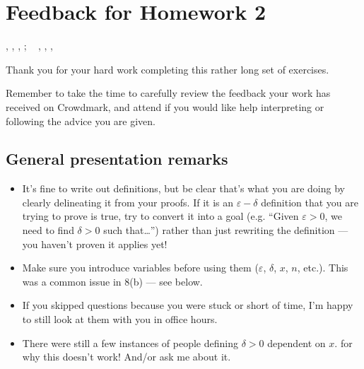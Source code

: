 \documentclass[letterpaper,10pt,english]{jupyterBook}
\begin{document}
\section{Feedback for Homework 2}
\label{\detokenize{HW-feedback:feedback-for-homework-2}}
\sphinxAtStartPar
{} {\hyperref[\detokenize{Problems:id8}]{}}, {\hyperref[\detokenize{Problems:id9}]{}}, {\hyperref[\detokenize{Problems:id19}]{}}, {\hyperref[\detokenize{Problems:id22}]{}} ;   {\hyperref[\detokenize{Solutions-upto46:id3}]{}}, {\hyperref[\detokenize{Solutions-upto46:id5}]{}}, {\hyperref[\detokenize{Solutions-upto46:id7}]{}}, {\hyperref[\detokenize{Solutions-upto46:id8}]{}}

\sphinxAtStartPar
Thank you for your hard work completing this rather long set of exercises.

\sphinxAtStartPar
Remember to take the time to carefully review the feedback your work has received on Crowdmark, and attend  if you would like help interpreting or following the advice you are given.


\subsection{General presentation remarks}
\label{\detokenize{HW-feedback:general-presentation-remarks}}\begin{itemize}
\item {} 
\sphinxAtStartPar
It’s fine to write out definitions, but be clear that’s what you are doing by clearly delineating it from your proofs. If it is an \(\varepsilon-\delta\) definition that you are trying to prove is true, try to convert it into a goal (e.g. “Given \(\varepsilon>0\), we need to find \(\delta>0\) such that…”) rather than just rewriting the definition — you haven’t proven it applies yet!

\item {} 
\sphinxAtStartPar
Make sure you introduce variables before using them (\(\varepsilon\), \(\delta\), \(x\), \(n\), etc.). This was a common issue in 8(b) — see below.

\item {} 
\sphinxAtStartPar
If you skipped questions because you were stuck or short of time, I’m happy to still look at them with you in office hours.

\item {} 
\sphinxAtStartPar
There were still a few instances of people defining \(\delta>0\) dependent on \(x\). {\hyperref[\detokenize{HW-feedback:iiifeedback}]{}} for why this doesn’t work! And/or ask me about it.

\end{itemize}
\end{document}
